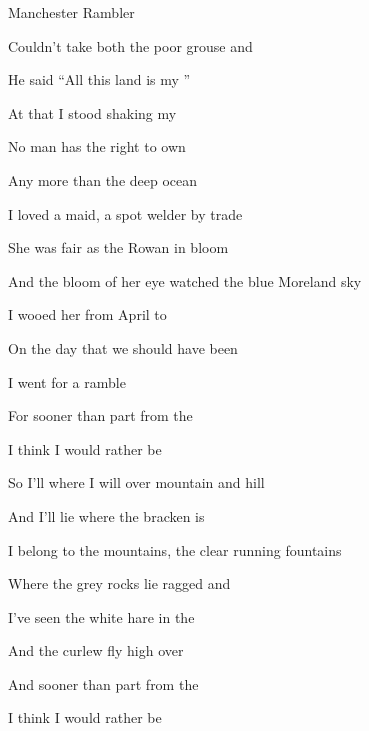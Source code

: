 \begin{SBSong}{Manchester Rambler}
\begin{SBVerse}
	Couldn't take both the poor grouse and 
	
	He said ``All this land is my ''
	
	At that I stood shaking my 
	
	No man has the right to own 
	
	Any more than the deep ocean 
  \end{SBVerse}
  \begin{SBVerse}
	I  loved a maid, a spot welder by trade
	
	She was fair as the Rowan in bloom
	
	And the bloom of her eye watched the blue Moreland sky
	
	I wooed her from April to 
	
	On the day that we should have been 
	
	I went for a ramble 
	
	For sooner than part from the 
	
	I think I would rather be  
  \end{SBVerse}
  \begin{SBVerse}
	So I'll  where I will over mountain and hill
	
	And I'll lie where the bracken is 
	
	I belong to the mountains, the clear running fountains
	
	Where the grey rocks lie ragged and 
	
	I've seen the white hare in the 
	
	And the curlew fly high over
	
	And sooner than part from the  
	
	I think I would rather be 
  \end{SBVerse}
 \end{SBSong}